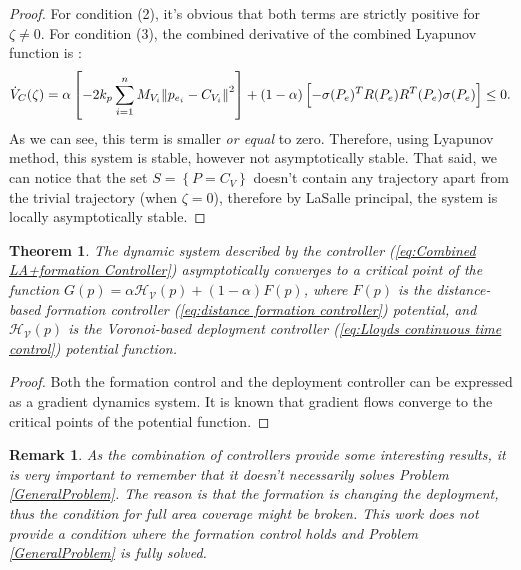 \documentclass{iacas}
\newtheorem{theorem}{Theorem}
\newtheorem{remark}{Remark}
\begin{document}
\begin{proof}
For condition (2), it's obvious that both terms are strictly positive for $\zeta \neq 0$.
For condition (3), the combined derivative of the combined Lyapunov function is \cite{Cortes2004}:
    \begin{equation}
        \dot{V}_{C}(\zeta) = \alpha \left[ -2k_{p}\sum_{i=1}^{n}M_{V_{i}}\norm{p_{e_{i}} - C_{V_{i}}}^{2} \right] + (1-\alpha)\left[ -\sigma(P_e)^{T}R(P_e)R^{T}(P_e)\sigma(P_e) \right] \leq 0.
    \end{equation}
    As we can see, this term is smaller \emph{or equal} to zero. Therefore, using Lyapunov method, this system is stable, however not asymptotically stable. That said, we can notice that the set $S = \left\{ P = C_{V} \right\}$ doesn't contain any trajectory apart from the trivial trajectory (when $\zeta = 0$), therefore by LaSalle principal, the system is locally asymptotically stable.
\end{proof}

\begin{theorem}
The dynamic system described by the controller (\ref{eq:Combined LA+formation Controller}) asymptotically converges to a critical point of the function $G(p) = \alpha \mathcal{H}_{\mathcal{V}}(p) + (1-\alpha) F(p)$, where $F(p)$ is the distance-based formation controller (\ref{eq:distance formation controller})  potential, and $\mathcal{H}_{\mathcal{V}}(p)$ is the Voronoi-based deployment controller (\ref{eq:Lloyds continuous time control}) potential function\cite{Cortes2004}.
    \label{theorem: combined controller stability}
\end{theorem}
\begin{proof}
Both the formation control and the deployment controller can be expressed as a gradient dynamics system. It is
known that gradient flows converge to the critical points of the potential function.
\end{proof}


\begin{remark}As the combination of controllers provide some interesting results, it is very important to remember that it doesn't necessarily solves Problem \ref{GeneralProblem}. The reason is that the formation is changing the deployment, thus the condition for full area coverage might be broken. This work \emph{does not} provide a condition where the formation control holds \emph{and} Problem \ref{GeneralProblem} is fully solved.
\end{remark}
\end{document}
